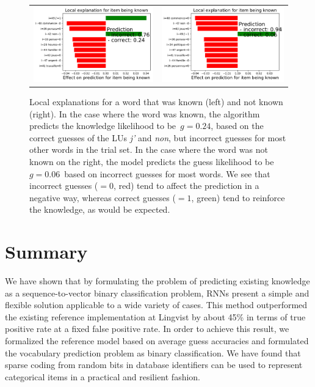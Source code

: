 \begin{figure}[ht]
\label{fig:lime}
\centering
\begin{tabular}{cc}
\includegraphics[width=0.4\linewidth]{figures/lingvist/lime_pos.pdf} &
\includegraphics[width=0.4\linewidth]{figures/lingvist/lime_neg.pdf} \\
\end{tabular}
\caption[Local explanations of the model prediction]{Local explanations for a word that was known (left) and not known (right). In the case where the word was known, the algorithm predicts the knowledge likelihood to be~$g = 0.24$, based on the correct guesses of the LUs \textit{j'} and \textit{non}, but incorrect guesses for most other words in the trial set. In the case where the word was not known on the right, the model predicts the guess likelihood to be~$g = 0.06$~based on incorrect guesses for most words. We see that incorrect guesses ($=0$, red) tend to affect the prediction in a negative way, whereas correct guesses ($=1$, green) tend to reinforce the knowledge, as would be expected.}
\end{figure}


\section{Summary}
We have shown that by formulating the problem of predicting existing knowledge as a sequence-to-vector binary classification problem, RNNs present a simple and flexible solution applicable to a wide variety of cases. This method outperformed the existing reference implementation at Lingvist by about 45\% in terms of true positive rate at a fixed false positive rate. In order to achieve this result, we formalized the reference model based on average guess accuracies and formulated the vocabulary prediction problem as binary classification. We have found that sparse coding from random bits in database identifiers can be used to represent categorical items in a practical and resilient fashion.

